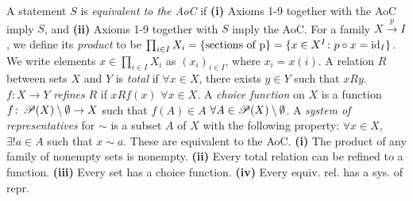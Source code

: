  A statement $S$ is \textit{equivalent to the AoC} if \textbf{(i)} Axioms 1-9 together with the AoC imply $S$, and \textbf{(ii)} Axioms 1-9 together with $S$ imply the AoC.
 For a family $X \xrightarrow{p} I$, we define its \textit{product} to be $\prod_{i \in I} X_i = \{ \text{sections of p} \} = \{ x \in X^I \colon p \circ x = \operatorname{id}_I \}$. We write elements $x \in \prod_{i \in I} X_i$ as $(x_i)_{i \in I}$, where $x_i = x(i)$.
 A relation $R$ between sets $X$ and $Y$ is \textit{total} if $\forall x \in X$, there exists $y \in Y$ such that $xRy$.
 $f \colon X \to Y$ \textit{refines} $R$ if $xRf(x)$ $\forall x \in X$.
 A \textit{choice function} on $X$ is a function $f \colon \operatorname{\mathscr{P}}(X) \setminus \emptyset \to X$ such that $f(A) \in A$ $\forall A \in \operatorname{\mathscr{P}}(X) \setminus \emptyset$.
 A \textit{system of representatives} for $\sim$ is a subset $A$ of $X$ with the following property: $\forall x \in X$, $\exists! a \in A$ such that $x \sim a$.
 These are equivalent to the AoC. \textbf{(i)} The product of any family of nonempty sets is nonempty. \textbf{(ii)} Every total relation can be refined to a function. \textbf{(iii)} Every set has a choice function. \textbf{(iv)} Every equiv. rel. has a sys. of repr.
